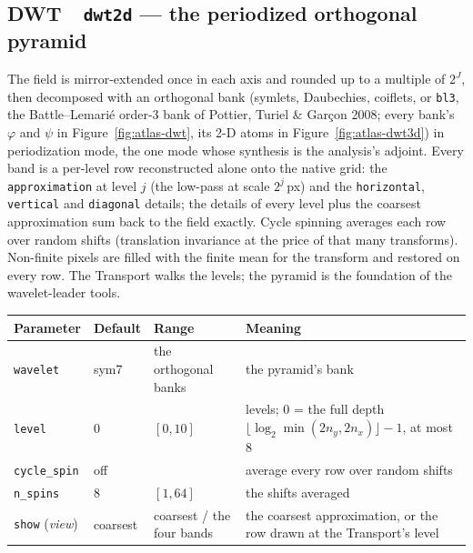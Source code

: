 \documentclass[10pt]{article}
\newcommand{\dev}[1]{\texttt{#1}}
\newcommand{\tool}[2]{#1~\textperiodcentered~\dev{#2}}
\begin{document}
\subsection{\tool{DWT}{dwt2d} --- the periodized orthogonal pyramid}
The field is mirror-extended once in each axis and rounded up to a multiple of $2^J$, then
decomposed with an orthogonal bank (symlets, Daubechies, coiflets, or \texttt{bl3}, the
Battle--Lemari\'e order-3 bank of Pottier, Turiel \& Gar\c{c}on 2008; every bank's $\varphi$ and
$\psi$ in Figure~\ref{fig:atlas-dwt}, its 2-D atoms in Figure~\ref{fig:atlas-dwt3d}) in periodization mode,
the one mode whose synthesis is the analysis's adjoint. Every band is a per-level row
reconstructed alone onto the native grid: the \texttt{approximation} at level $j$ (the
low-pass at scale $2^j$\,px) and the \texttt{horizontal}, \texttt{vertical} and
\texttt{diagonal} details; the details of every level plus the coarsest approximation sum back
to the field exactly. Cycle spinning averages each row over random shifts (translation
invariance at the price of that many transforms). Non-finite pixels are filled with the finite
mean for the transform and restored on every row. The Transport walks the levels; the pyramid
is the foundation of the wavelet-leader tools.

\begin{longtable}{L l l M}
\toprule Parameter & Default & Range & Meaning \\ \midrule
\texttt{wavelet} & sym7 & the orthogonal banks & the pyramid's bank \\
\texttt{level} & 0 & $[0,10]$ & levels; $0$ = the full depth $\lfloor\log_2 \min(2n_y, 2n_x)\rfloor - 1$, at most 8 \\
\texttt{cycle\_spin} & off & & average every row over random shifts \\
\texttt{n\_spins} & 8 & $[1,64]$ & the shifts averaged \\
\texttt{show} (\emph{view}) & coarsest & coarsest / the four bands & the coarsest approximation, or the row drawn at the Transport's level \\
\bottomrule
\end{longtable}
\end{document}
